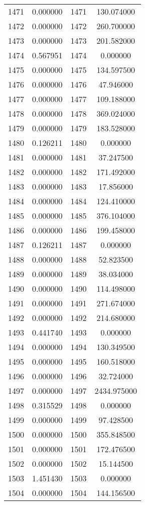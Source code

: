 \documentclass[12pt]{article}
\begin{document}
\begin{longtable}{@{}cccc@{}}
1471 & 0.000000 & 1471 & 130.074000 \\
1472 & 0.000000 & 1472 & 260.700000 \\
1473 & 0.000000 & 1473 & 201.582000 \\
1474 & 0.567951 & 1474 & 0.000000 \\
1475 & 0.000000 & 1475 & 134.597500 \\
1476 & 0.000000 & 1476 & 47.946000 \\
1477 & 0.000000 & 1477 & 109.188000 \\
1478 & 0.000000 & 1478 & 369.024000 \\
1479 & 0.000000 & 1479 & 183.528000 \\
1480 & 0.126211 & 1480 & 0.000000 \\
1481 & 0.000000 & 1481 & 37.247500 \\
1482 & 0.000000 & 1482 & 171.492000 \\
1483 & 0.000000 & 1483 & 17.856000 \\
1484 & 0.000000 & 1484 & 124.410000 \\
1485 & 0.000000 & 1485 & 376.104000 \\
1486 & 0.000000 & 1486 & 199.458000 \\
1487 & 0.126211 & 1487 & 0.000000 \\
1488 & 0.000000 & 1488 & 52.823500 \\
1489 & 0.000000 & 1489 & 38.034000 \\
1490 & 0.000000 & 1490 & 114.498000 \\
1491 & 0.000000 & 1491 & 271.674000 \\
1492 & 0.000000 & 1492 & 214.680000 \\
1493 & 0.441740 & 1493 & 0.000000 \\
1494 & 0.000000 & 1494 & 130.349500 \\
1495 & 0.000000 & 1495 & 160.518000 \\
1496 & 0.000000 & 1496 & 32.724000 \\
1497 & 0.000000 & 1497 & 2434.975000 \\
1498 & 0.315529 & 1498 & 0.000000 \\
1499 & 0.000000 & 1499 & 97.428500 \\
1500 & 0.000000 & 1500 & 355.848500 \\
1501 & 0.000000 & 1501 & 172.476500 \\
1502 & 0.000000 & 1502 & 15.144500 \\
1503 & 1.451430 & 1503 & 0.000000 \\
1504 & 0.000000 & 1504 & 144.156500 \\

\end{longtable}
\end{document}
